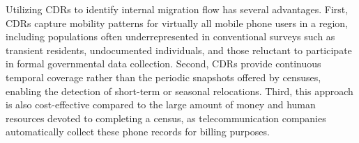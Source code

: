 

Utilizing CDRs to identify internal migration flow has several advantages. First, CDRs capture mobility patterns for virtually all mobile phone users in a region, including populations often underrepresented in conventional surveys such as transient residents, undocumented individuals, and those reluctant to participate in formal governmental data collection. Second, CDRs provide continuous temporal coverage rather than the periodic snapshots offered by censuses, enabling the detection of short-term or seasonal relocations. Third, this approach is also cost-effective compared to the large amount of money and human resources devoted to completing a census, as telecommunication companies automatically collect these phone records for billing purposes.




